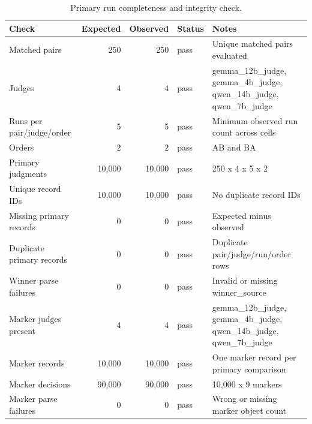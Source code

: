 \begin{table}[t]
\centering
\scriptsize
\setlength{\tabcolsep}{3.2pt}
\begin{tabular}{lrrll}
\toprule
Check & Expected & Observed & Status & Notes \\
\midrule
Matched pairs & 250 & 250 & pass & Unique matched pairs evaluated \\
Judges & 4 & 4 & pass & gemma\_12b\_judge, gemma\_4b\_judge, qwen\_14b\_judge, qwen\_7b\_judge \\
Runs per pair/judge/order & 5 & 5 & pass & Minimum observed run count across cells \\
Orders & 2 & 2 & pass & AB and BA \\
Primary judgments & 10,000 & 10,000 & pass & 250 x 4 x 5 x 2 \\
Unique record IDs & 10,000 & 10,000 & pass & No duplicate record IDs \\
Missing primary records & 0 & 0 & pass & Expected minus observed \\
Duplicate primary records & 0 & 0 & pass & Duplicate pair/judge/run/order rows \\
Winner parse failures & 0 & 0 & pass & Invalid or missing winner\_source \\
Marker judges present & 4 & 4 & pass & gemma\_12b\_judge, gemma\_4b\_judge, qwen\_14b\_judge, qwen\_7b\_judge \\
Marker records & 10,000 & 10,000 & pass & One marker record per primary comparison \\
Marker decisions & 90,000 & 90,000 & pass & 10,000 x 9 markers \\
Marker parse failures & 0 & 0 & pass & Wrong or missing marker object count \\
\bottomrule
\end{tabular}
\caption{Primary run completeness and integrity check.}
\label{tab:integrity}
\end{table}

